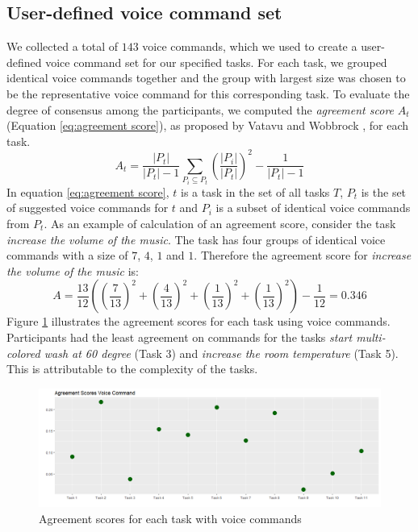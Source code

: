 \documentclass[sigchi]{acmart}
\begin{document}
	\subsection{User-defined voice command set}
We collected a total of $143$ voice commands, which we used to create a user-defined voice command set for our specified tasks. For each task, we grouped identical voice commands together and the group with largest size was chosen to be the representative voice command for this corresponding task. To evaluate the degree of consensus among the participants, we computed the \textit{agreement score} $A_t$ (Equation \ref{eq:agreement score}), as proposed by Vatavu and Wobbrock \cite{Vatavu.2015}, for each task.
		\begin{equation}
			\label{eq:agreement score}
			A_t = \frac{|P_t|}{|P_t|-1} \sum_{P_i \subseteq P_t} \left(\frac{|P_i|}{|P_t|}\right)^2  - \frac{1}{|P_t|-1}
		\end{equation}
In equation \ref{eq:agreement score}, $t$ is a task in the set of all tasks $T$, $P_t$ is the set of suggested voice commands for $t$ and $P_i$ is a subset of identical voice commands from $P_t$. 
As an example of calculation of an agreement score, consider the task \textit{increase the volume of the music}. The task has four groups of identical voice commands with a size of $7$, $4$, $1$ and $1$. Therefore the agreement score for \textit{increase the volume of the music} is:
		\begin{equation}
			A = \frac{13}{12} \left(\left(\frac{7}{13}\right)^2 + \left(\frac{4}{13}\right)^2 + \left(\frac{1}{13}\right)^2 + \left(\frac{1}{13}\right)^2 \right)- \frac{1}{12} = 0.346
		\end{equation}
		Figure \ref{figure:ASvoice} illustrates the agreement scores for each task using voice commands. Participants had the least agreement on commands for the tasks \textit{start multi-colored wash at 60 degree} (Task 3) and \textit{increase the room temperature} (Task 5). This is attributable to the complexity of the tasks.
		\begin{figure}			
			\centering
			\includegraphics[width=\textwidth]{AgreementVoice}
			\caption{Agreement scores for each task with voice commands}
			\label{figure:ASvoice}
		\end{figure}
\end{document}
